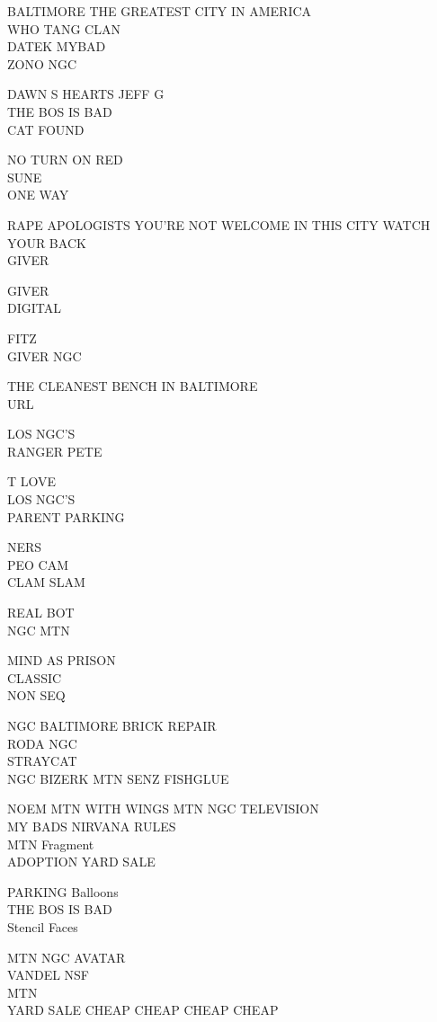 \documentclass[10pt,letterpaper]{article}
\begin{document}
BALTIMORE THE GREATEST CITY IN AMERICA\\
WHO TANG CLAN\\
DATEK MYBAD\\
ZONO NGC

DAWN S HEARTS JEFF G\\
THE BOS IS BAD\\
CAT FOUND

NO TURN ON RED\\
SUNE\\
ONE WAY

RAPE APOLOGISTS YOU'RE NOT WELCOME IN THIS CITY WATCH YOUR BACK\\
GIVER

GIVER\\
DIGITAL

FITZ\\
GIVER NGC

THE CLEANEST BENCH IN BALTIMORE\\
URL

LOS NGC'S\\
RANGER PETE

T LOVE\\
LOS NGC'S\\
PARENT PARKING

NERS\\
PEO CAM\\
CLAM SLAM

REAL BOT\\
NGC MTN

MIND AS PRISON\\
CLASSIC\\
NON SEQ

NGC BALTIMORE BRICK REPAIR\\
RODA NGC\\
STRAYCAT\\
NGC BIZERK MTN SENZ FISHGLUE

NOEM MTN WITH WINGS MTN NGC TELEVISION\\
MY BADS NIRVANA RULES\\
MTN Fragment\\
ADOPTION YARD SALE

PARKING Balloons\\
THE BOS IS BAD\\
Stencil Faces

MTN NGC AVATAR\\
VANDEL NSF\\
MTN\\
YARD SALE CHEAP CHEAP CHEAP CHEAP
\end{document}
